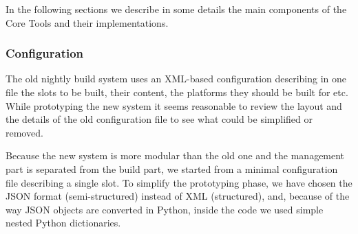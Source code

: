 \documentclass{lhcbnote}
\begin{document}
In the following sections we describe in some details the main components of the
Core Tools and their implementations.

\subsubsection{Configuration}
The old nightly build system uses an XML-based configuration describing in one
file the slots to be built, their content, the platforms they should be built
for etc.  While prototyping the new system it seems reasonable to review the
layout and the details of the old configuration file to see what could be
simplified or removed.

Because the new system is more modular than the old one and the management part
is separated from the build part, we started from a minimal configuration file
describing a single slot.  To simplify the prototyping phase, we have chosen the
JSON format (semi-structured) instead of XML (structured), and, because of the
way JSON objects are converted in Python, inside the code we used simple nested
Python dictionaries.
\end{document}
